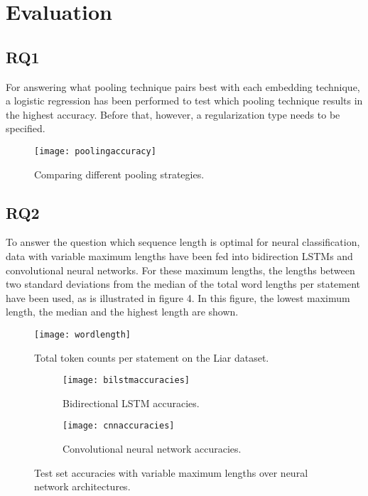 \section{Evaluation}

\subsection{RQ1}
For answering what pooling technique pairs best with each embedding technique, a logistic regression has been performed to test which pooling technique results in the highest accuracy.
Before that, however, a regularization type needs to be specified. 

\begin{figure}[h]
    \centering
    \texttt{[image: poolingaccuracy]}
    \caption{Comparing different pooling strategies.}
\end{figure}

\subsection{RQ2}
To answer the question which sequence length is optimal for neural classification, data with variable maximum lengths have been fed into bidirection LSTMs and convolutional neural networks.
For these maximum lengths, the lengths between two standard deviations from the median of the total word lengths per statement have been used, as is illustrated in figure 4. 
In this figure, the lowest maximum length, the median and the highest length are shown.

\begin{figure}
    \centering
    \texttt{[image: wordlength]}
    \caption{Total token counts per statement on the Liar dataset.}
\end{figure}

\begin{figure}[h]
    \centering
    \begin{subfigure}[b]{1\textwidth}
       \texttt{[image: bilstmaccuracies]}
       \caption{Bidirectional LSTM accuracies.}
    \end{subfigure}
    
    \begin{subfigure}[b]{1\textwidth}
       \texttt{[image: cnnaccuracies]}
       \caption{Convolutional neural network accuracies.}
    \end{subfigure}
    
    \caption{Test set accuracies with variable maximum lengths over neural network architectures.}
\end{figure}

